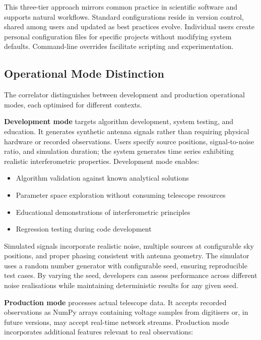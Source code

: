 This three-tier approach mirrors common practice in scientific software and supports natural workflows. Standard configurations reside in version control, shared among users and updated as best practices evolve. Individual users create personal configuration files for specific projects without modifying system defaults. Command-line overrides facilitate scripting and experimentation.

\subsection{Operational Mode Distinction}

The correlator distinguishes between development and production operational modes, each optimised for different contexts.

\textbf{Development mode} targets algorithm development, system testing, and education. It generates synthetic antenna signals rather than requiring physical hardware or recorded observations. Users specify source positions, signal-to-noise ratio, and simulation duration; the system generates time series exhibiting realistic interferometric properties. Development mode enables:

\begin{itemize}
    \item Algorithm validation against known analytical solutions
    \item Parameter space exploration without consuming telescope resources
    \item Educational demonstrations of interferometric principles
    \item Regression testing during code development
\end{itemize}

Simulated signals incorporate realistic noise, multiple sources at configurable sky positions, and proper phasing consistent with antenna geometry. The simulator uses a random number generator with configurable seed, ensuring reproducible test cases. By varying the seed, developers can assess performance across different noise realisations while maintaining deterministic results for any given seed.

\textbf{Production mode} processes actual telescope data. It accepts recorded observations as NumPy arrays containing voltage samples from digitisers or, in future versions, may accept real-time network streams. Production mode incorporates additional features relevant to real observations:

